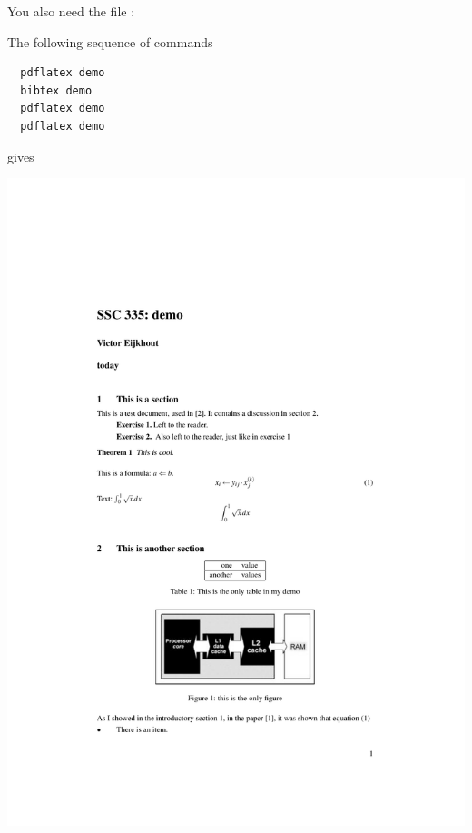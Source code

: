 You also need the file :

\begingroup\small

\endgroup

The following sequence of commands
\begin{verbatim}
  pdflatex demo
  bibtex demo
  pdflatex demo
  pdflatex demo
\end{verbatim}
gives 

\includegraphics[scale=.75]{tutorials/latexdemo/demopage1}

